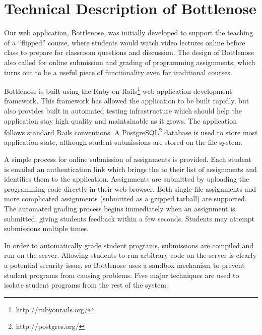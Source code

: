 \section{Technical Description of Bottlenose}

Our web application, Bottlenose, was initially developed to support
the teaching of a ``flipped'' course, where students would watch video %
lectures online before class to prepare for classroom questions and
discussion. The design of Bottlenose also called for online submission %
and grading of programming assignments, which turns out to be a useful
piece of functionality even for traditional courses.

Bottlenose is built using the Ruby on                                   %
Rails\footnote{http://rubyonrails.org/} web application development
framework. This framework has allowed the application to be built
rapidly, but also provides built in automated testing infrastructure which
should help the application stay high quality and maintainable as it     %
grows. The application follows standard Rails conventions. A
PostgreSQL\footnote{http://postgres.org/} database is used to store most
application state, although student submissions are stored on the file
system.

A simple process for online submission of assignments is
provided. Each student is emailed an authentication link which brings
the to their list of assignments and identifies them to the
application. Assignments are submitted by uploading the programming
code directly in their web browser. Both single-file assignments and
more complicated assignments (submitted as a gzipped tarball) are       %
supported. The automated grading process begins immediately when an
assignment is submitted, giving students feedback within a few
seconds.  Students may attempt submissions multiple times.

In order to automatically grade student programs, submissions are
compiled and run on the server. Allowing students to run arbitrary
code on the server is clearly a potential security issue, so
Bottlenose uses a sandbox mechanism to prevent student programs from    %
causing problems. Five major techniques are used to isolate student
programs from the rest of the system:

